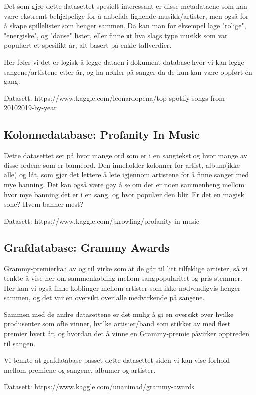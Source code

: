 Det som gjør dette datasettet spesielt interessant er disse metadataene som kan være ekstremt behjelpelige for å anbefale lignende musikk/artister, men også for å skape spillelister som henger sammen. Da kan man for eksempel lage "rolige", "energiske", og "danse" lister, eller finne ut hva slags type musikk som var populært et spesifikt år, alt basert på enkle tallverdier.

Her føler vi det er logisk å legge dataen i dokument database hvor vi kan legge sangene/artistene etter år, og ha nøkler på sanger da de kun kan være oppført én gang.

Datasett: https://www.kaggle.com/leonardopena/top-spotify-songs-from-20102019-by-year

\subsection{Kolonnedatabase: Profanity In Music}
Dette datasettet ser på hvor mange ord som er i en sangtekst og hvor mange av disse ordene som er banneord. Den inneholder kolonner for artist, album(ikke alle) og låt, som gjør det lettere å lete igjennom artistene for å finne sanger med mye banning. Det kan også være gøy å se om det er noen sammenheng mellom hvor mye banning det er i en sang, og hvor populær den blir. Er det en magisk sone? Hvem banner mest?

Datasett: https://www.kaggle.com/jkrowling/profanity-in-music

\subsection{Grafdatabase: Grammy Awards}
Grammy-premierkan av og til virke som at de går til litt tilfeldige artister, så vi tenkte å vise her om sammenkobling mellom sangpopularitet og pris stemmer. Her kan vi også finne koblinger mellom artister som ikke nødvendigvis henger sammen, og det var en oversikt over alle medvirkende på sangene.

Sammen med de andre datasettene er det mulig å gi en oversikt over hvilke produsenter som ofte vinner, hvilke artister/band som stikker av med flest premier hvert år, og hvordan det å vinne en Grammy-premie påvirker opptreden til sangen.

Vi tenkte at grafdatabase passet dette datasettet siden vi kan vise forhold mellom premiene og sangene, albumer og artister.

Datasett: https://www.kaggle.com/unanimad/grammy-awards

